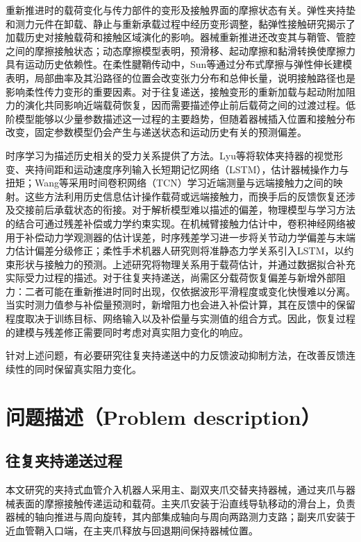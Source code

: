 \documentclass{JQRnew}
\providecommand{\RevisionColor}{\color{black}}
\newcommand{\revbegin}{\begingroup\RevisionColor}
\newcommand{\revend}{\par\endgroup}
\begin{document}
重新推进时的载荷变化与传力部件的变形及接触界面的摩擦状态有关。弹性夹持垫和测力元件在卸载、静止与重新承载过程中经历变形调整，黏弹性接触研究揭示了加载历史对接触载荷和接触区域演化的影响。器械重新推进还改变其与鞘管、管腔之间的摩擦接触状态；动态摩擦模型表明，预滑移、起动摩擦和黏滑转换使摩擦力具有运动历史依赖性。在柔性腱鞘传动中，Sun等通过分布式摩擦与弹性伸长建模表明，局部曲率及其沿路径的位置会改变张力分布和总伸长量，说明接触路径也是影响柔性传力变形的重要因素。对于往复递送，接触变形的重新加载与起动附加阻力的演化共同影响近端载荷恢复，因而需要描述停止前后载荷之间的过渡过程。低阶模型能够以少量参数描述这一过程的主要趋势，但随着器械插入位置和接触分布改变，固定参数模型仍会产生与递送状态和运动历史有关的预测偏差。

时序学习为描述历史相关的受力关系提供了方法。Lyu等将软体夹持器的视觉形变、夹持间距和运动速度序列输入长短期记忆网络（LSTM），估计器械操作力与扭矩；Wang等采用时间卷积网络（TCN）学习近端测量与远端接触力之间的映射。这些方法利用历史信息估计操作载荷或远端接触力，而换手后的反馈恢复还涉及交接前后承载状态的衔接。对于解析模型难以描述的偏差，物理模型与学习方法的结合可通过残差补偿或力学约束实现。在机械臂接触力估计中，卷积神经网络被用于补偿动力学观测器的估计误差，时序残差学习进一步将关节动力学偏差与末端力估计偏差分级修正；柔性手术机器人研究则将准静态力学关系引入LSTM，以约束形状与接触力的预测。上述研究将物理关系用于载荷估计，并通过数据拟合补充实际受力过程的描述。对于往复夹持递送，尚需区分载荷恢复偏差与新增外部阻力：二者可能在重新推进时同时出现，仅依据波形平滑程度或变化快慢难以分离。当实时测力值参与补偿量预测时，新增阻力也会进入补偿计算，其在反馈中的保留程度取决于训练目标、网络输入以及补偿量与实测值的组合方式。因此，恢复过程的建模与残差修正需要同时考虑对真实阻力变化的响应。

针对上述问题，有必要研究往复夹持递送中的力反馈波动抑制方法，在改善反馈连续性的同时保留真实阻力变化。

\section{问题描述（Problem description）}

\subsection{往复夹持递送过程}

\revbegin
本文研究的夹持式血管介入机器人采用主、副双夹爪交替夹持器械，通过夹爪与器械表面的摩擦接触传递运动和载荷。主夹爪安装于沿直线导轨移动的滑台上，负责器械的轴向推进与周向旋转，其内部集成轴向与周向两路测力支路；副夹爪安装于近血管鞘入口端，在主夹爪释放与回退期间保持器械位置。
\revend
\end{document}

